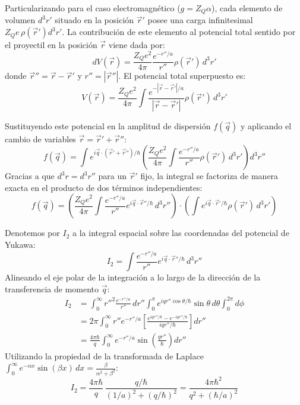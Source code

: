 Particularizando para el caso electromagnético ($g = Z_Q \alpha$), cada elemento de volumen $d^3r'$ situado en la posición $\vec{r}'$ posee una carga infinitesimal $Z_Q e \, \rho(\vec{r}') d^3r'$. La contribución de este elemento al potencial total sentido por el proyectil en la posición $\vec{r}$ viene dada por:
\begin{equation}
    d V(\vec{r}) = \frac{Z_Q e^2}{4\pi} \frac{e^{-r''/a}}{r''} \rho(\vec{r}') \, d^3r'
\end{equation}
donde $\vec{r}'' = \vec{r} - \vec{r}'$ y $r'' = |\vec{r}''|$. El potencial total superpuesto es:
\begin{equation}
    V(\vec{r}) = \frac{Z_Q e^2}{4\pi} \int \frac{e^{-|\vec{r} - \vec{r}'|/a}}{|\vec{r} - \vec{r}'|} \rho(\vec{r}') \, d^3r'
\end{equation}

Sustituyendo este potencial en la amplitud de dispersión $f(\vec{q})$ y aplicando el cambio de variables $\vec{r} = \vec{r}' + \vec{r}''$:
\begin{equation}
    f(\vec{q}) = \int e^{i \vec{q} \cdot (\vec{r}' + \vec{r}'') / \hbar} \left( \frac{Z_Q e^2}{4\pi} \int \frac{e^{-r''/a}}{r''} \rho(\vec{r}') \, d^3r' \right) d^3r''
\end{equation}
Gracias a que $d^3r = d^3r''$ para un $\vec{r}'$ fijo, la integral se factoriza de manera exacta en el producto de dos términos independientes:
\begin{equation}
    f(\vec{q}) = \left( \frac{Z_Q e^2}{4\pi} \int \frac{e^{-r''/a}}{r''} e^{i \vec{q} \cdot \vec{r}'' / \hbar} \, d^3r'' \right) \cdot \left( \int e^{i \vec{q} \cdot \vec{r}' / \hbar} \rho(\vec{r}') \, d^3r' \right)
\end{equation}

Denotemos por $I_2$ a la integral espacial sobre las coordenadas del potencial de Yukawa:
\begin{equation}
    I_2 = \int \frac{e^{-r''/a}}{r''} e^{i \vec{q} \cdot \vec{r}'' / \hbar} \, d^3r''
\end{equation}
Alineando el eje polar de la integración a lo largo de la dirección de la transferencia de momento $\vec{q}$:
\begin{align}
    I_2 &= \int_0^\infty {r''}^2 \frac{e^{-r''/a}}{r''} \, dr'' \int_0^\pi e^{i q r'' \cos\theta / \hbar} \sin\theta \, d\theta \int_0^{2\pi} d\phi \nonumber \\
    &= 2\pi \int_0^\infty r'' e^{-r''/a} \left[ \frac{e^{i q r'' / \hbar} - e^{-i q r'' / \hbar}}{i q r'' / \hbar} \right] dr'' \nonumber \\
    &= \frac{4\pi \hbar}{q} \int_0^\infty e^{-r''/a} \sin\left(\frac{q r''}{\hbar}\right) dr''
\end{align}
Utilizando la propiedad de la transformada de Laplace $\int_0^\infty e^{-\alpha x} \sin(\beta x) \, dx = \frac{\beta}{\alpha^2 + \beta^2}$:
\begin{equation}
    I_2 = \frac{4\pi \hbar}{q} \, \frac{q/\hbar}{(1/a)^2 + (q/\hbar)^2} = \frac{4\pi \hbar^2}{q^2 + (\hbar/a)^2}
\end{equation}

